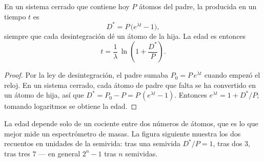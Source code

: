 \begin{proposition}\label{prop:b1:radiometric-methods:growth}
En un sistema cerrado que contiene hoy $P$ átomos del padre, la  producida en un tiempo $t$ es
\[
  D^* = P\,\bigl(e^{\lambda t} - 1\bigr),
\]
siempre que cada desintegración dé un átomo de la hija. La edad es entonces
\[
  t = \frac{1}{\lambda}\,\ln\!\left(1 + \frac{D^*}{P}\right).
\]
\end{proposition}

\begin{proof}
Por la ley de desintegración, el padre sumaba $P_0 = P\,e^{\lambda t}$ cuando empezó el reloj. En un sistema cerrado, cada átomo de padre que falta se ha
convertido en un átomo de hija, así que $D^* = P_0 - P = P\,(e^{\lambda t} - 1)$. Entonces $e^{\lambda t} = 1 +
D^*/P$; tomando logaritmos se obtiene la edad.
\end{proof}

La edad depende solo de un cociente entre dos números de átomos, que es lo que mejor mide un espectrómetro de masas. La figura siguiente muestra los dos recuentos en unidades de la semivida: tras una semivida $D^*/P = 1$, tras dos $3$, tras tres $7$
--- en general $2^n - 1$ tras $n$ semividas.

